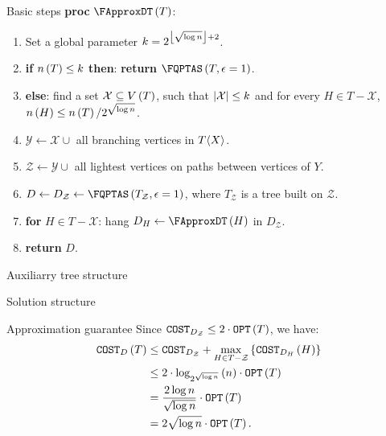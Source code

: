 \begin{frame}{Basic steps}{}
\textbf{proc} $\FApproxDT\br{T}$:
\begin{enumerate}
    \item Set a global parameter $k=2^{\left\lfloor \sqrt{\log n} \right\rfloor+2}$.
    \item \textbf{if} $n\left( T \right)\leq k$ \textbf{then}: \textbf{return} $\FQPTAS\br{ T , \epsilon = 1}$.
    \item \textbf{else}: find a set $\mathcal{X}\subseteq V\left(  T  \right)$, such that $\left| \mathcal{X} \right|\leq k$ and for every $H\in T - \mathcal{X}$, $n\left( H \right)\leq n\left(  T  \right)/2^{\sqrt{\log n}}$.
    \item $\mathcal{Y}\gets \mathcal{X} \cup $ all branching vertices in $ T \langle X \rangle$.
    \item $\mathcal{Z}\gets \mathcal{Y} \cup$ all lightest vertices on paths between vertices of $Y$.
    \item $D\gets D_\mathcal{Z}\gets \FQPTAS\br{T_{\mathcal{Z}}, \epsilon = 1}$, where $ T _{\mathcal{Z}}$ is a tree built on $\mathcal{Z}$.
    \item \textbf{for} $H\in T - \mathcal{X}$: hang $D_H\gets\FApproxDT\br{H}$ in $D_{\mathcal{Z}}$.
    \item \textbf{return} $D$.
\end{enumerate}
\end{frame}
\begin{frame}{Auxiliarry tree structure}
    
\end{frame}
\begin{frame}{Solution structure}
    
\end{frame}
\begin{frame}{Approximation guarantee}
Since $\texttt{COST}_{D_\mathcal{Z}}\leq 2\cdot \texttt{OPT}\left( T \right)$, we have:
\begin{align*}
    \texttt{COST}_D\left( T \right) &\leq \texttt{COST}_{D_\mathcal{Z}} + \max_{H\in T-\mathcal{Z}}\left\{ \texttt{COST}_{D_H}\left( H \right) \right\}
    \\&\leq 
    2\cdot \log_{2^{\sqrt{\log n}}}\left( n \right)\cdot \texttt{OPT}\left( T \right) 
    \\&=
     \frac{2\log n}{\sqrt{\log n}}\cdot \texttt{OPT}\left( T \right) 
     \\&=
      2\sqrt{\log n}\cdot \texttt{OPT}\left( T \right).
\end{align*}
\end{frame}

